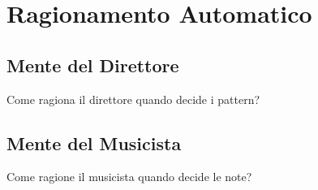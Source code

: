 \section{Ragionamento Automatico}
\subsection{Mente del Direttore}
Come ragiona il direttore quando decide i pattern?
\subsection{Mente del Musicista}
Come ragione il musicista quando decide le note?
